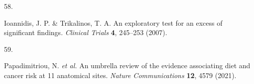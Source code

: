 \documentclass[
  english,
  man]{apa6}
\newlength{\cslhangindent}
\newlength{\csllabelwidth}
\newenvironment{CSLReferences}[2] %
 {%
  \setlength{\parindent}{0pt}
  \ifodd #1 \everypar{\setlength{\hangindent}{\cslhangindent}}\ignorespaces\fi
  \ifnum #2 > 0
  \setlength{\parskip}{#2\baselineskip}
  \fi
 }%
 {}
\newcommand{\CSLLeftMargin}[1]{\parbox[t]{\csllabelwidth}{#1}}
\newcommand{\CSLRightInline}[1]{\parbox[t]{\linewidth - \csllabelwidth}{#1}\break}
\begin{document}
\begin{CSLReferences}{0}{0}
\leavevmode{}%
\CSLLeftMargin{58. }
\CSLRightInline{Ioannidis, J. P. \& Trikalinos, T. A. An exploratory test for an excess of significant findings. \emph{Clinical Trials} \textbf{4}, 245--253 (2007).}

\leavevmode{}%
\CSLLeftMargin{59. }
\CSLRightInline{Papadimitriou, N. \emph{et al.} An umbrella review of the evidence associating diet and cancer risk at 11 anatomical sites. \emph{Nature Communications} \textbf{12}, 4579 (2021).}

\end{CSLReferences}

\newpage
\end{document}
